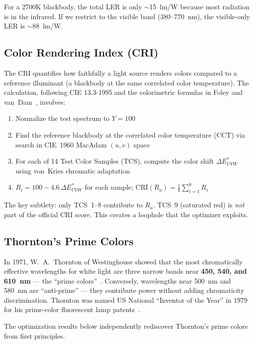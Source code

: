 \documentclass[11pt]{article}
\begin{document}
For a 2700K blackbody, the total LER is only $\sim$15~lm/W because most
radiation is in the infrared.  If we restrict to the visible band
(380--770~nm), the visible-only LER is $\sim$88~lm/W.

\subsection{Color Rendering Index (CRI)}

The CRI quantifies how faithfully a light source renders colors compared to a
reference illuminant (a blackbody at the same correlated color temperature).
The calculation, following CIE 13.3-1995 and the colorimetric formulas in
Foley and van~Dam~\cite{foley-vandam}, involves:

\begin{enumerate}
\item Normalize the test spectrum to $Y=100$
\item Find the reference blackbody at the correlated color temperature (CCT)
      via search in CIE~1960 MacAdam $(u,v)$ space
\item For each of 14 Test Color Samples (TCS), compute the color shift
      $\Delta E^*_{UVW}$ using von~Kries chromatic adaptation
\item $R_i = 100 - 4.6\,\Delta E^*_{UVW}$ for each sample; $\text{CRI}(R_a) =
      \frac{1}{8}\sum_{i=1}^{8} R_i$
\end{enumerate}

The key subtlety: only TCS~1--8 contribute to $R_a$.  TCS~9 (saturated red)
is \emph{not} part of the official CRI score.  This creates a loophole that
the optimizer exploits.

\subsection{Thornton's Prime Colors}

In 1971, W.~A.~Thornton of Westinghouse showed that the most chromatically
effective wavelengths for white light are three narrow bands near
\textbf{450, 540, and 610~nm} --- the ``prime colors''~\cite{thornton1971}.
Conversely, wavelengths near 500~nm and 580~nm are ``anti-prime'' ---
they contribute power without adding chromaticity discrimination.
Thornton was named US National ``Inventor of the Year'' in 1979 for his
prime-color fluorescent lamp patents~\cite{thornton-inventor}.

The optimization results below independently rediscover Thornton's prime
colors from first principles.
\end{document}
